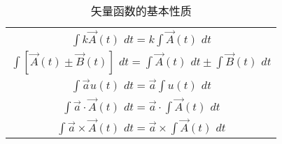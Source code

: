 	

\begin{table}[htbp]
	
	\centering
	\caption{矢量函数的基本性质}		 
	\begin{tabular}{c}
		\toprule	
		$
		\int{k\vec{A}\left( t \right)}\,\,\mathit{d}t=k\int{\vec{A}\left( t \right)}\,\,\mathit{d}t
		$\\
		$
		\int{\left[ \vec{A}\left( t \right) \pm \vec{B}\left( t \right) \right]}\,\,\mathit{d}t=\int{\vec{A}\left( t \right)}\,\,\mathit{d}t\pm \int{\vec{B}\left( t \right)}\,\,\mathit{d}t
		$\\
		$
		\int{\vec{a}u\left( t \right)}\,\,\mathit{d}t=\vec{a}\int{u\left( t \right)}\,\,\mathit{d}t
		$\\
		$
		\int{\vec{a}\cdot \vec{A}\left( t \right)}\,\,dt=\vec{a}\cdot \int{\vec{A}\left( t \right)}\,\,dt
		$\\
		$
		\int{\vec{a}\times \vec{A}\left( t \right)}\,\,dt=\vec{a}\times \int{\vec{A}\left( t \right)}\,\,dt
		$\\
		
		\bottomrule	
	\end{tabular}
\end{table}

	
	
